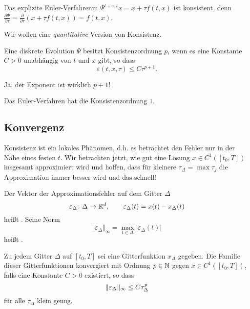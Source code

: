 \begin{bsp}
	Das explizite Euler-Verfahrenm $\Psi^{t+\tau,t} x=x+ \tau f(t,x)$ ist konsistent, denn $\frac{\partial \Psi}{\partial \tau} = \frac{\partial}{\partial \tau} (x+ \tau f(t,x))= f(t,x)$.
\end{bsp}

Wir wollen eine \textit{quantitative} Version von Konsistenz.

\begin{defi}
	Eine diskrete Evolution $\Psi$ besitzt Konsistenzordnung $p$, wenn es eine Konstante $C>0$ unabhängig von $t$ und $x$ gibt, so dass
	\begin{equation*}
	\varepsilon (t,x,\tau) \leq C \tau^{p+1}.
	\end{equation*}
\end{defi}

\begin{hinw}
	Ja, der Exponent ist wirklich $p+1$!
\end{hinw}

\begin{bsp}
	Das Euler-Verfahren	hat die Konsistenzordnung $1$.
\end{bsp}


\subsection{Konvergenz}

Konsistenz ist ein lokales Phänomen, d.h. es betrachtet den Fehler nur in der Nähe eines festen $t$. Wir betrachten jetzt, wie gut eine Lösung $x \in C^1 ([t_0,T])$ insgesamt approximiert wird und hoffen, dass für kleinere $\tau_{\Delta}=\max \tau_j$ die Approximation immer besser wird und das schnell!

\begin{defi}
	Der Vektor der Approximationsfehler auf dem Gitter $\Delta$
	\begin{equation*}
		\varepsilon_{\Delta} \colon \Delta \to \mathbb R^d,
		\qquad
		\varepsilon_\Delta(t) = x(t)-x_{\Delta}(t)
	\end{equation*}
	heißt . Seine Norm
	\begin{equation*}
		\Vert \varepsilon_{\Delta} \Vert_{\infty}=\max_{t \in \Delta} \vert \varepsilon_{\Delta} (t) \vert
	\end{equation*}
	heißt .
\end{defi}

\begin{defi}
	Zu jedem Gitter $\Delta$ auf $[t_0,T]$ sei eine Gitterfunktion $x_{\Delta}$ gegeben. Die Familie dieser Gitterfunktionen konvergiert mit Ordnung $p \in \mathbb N$ gegen $x \in C^1([t_0,T])$, falls eine Konstante $C>0$ existiert, so dass
	\begin{equation*}
		\lVert \varepsilon_{\Delta} \rVert_\infty \leq C \tau_{\Delta}^p
	\end{equation*}
	für alle $\tau_{\Delta}$ klein genug.
\end{defi}

